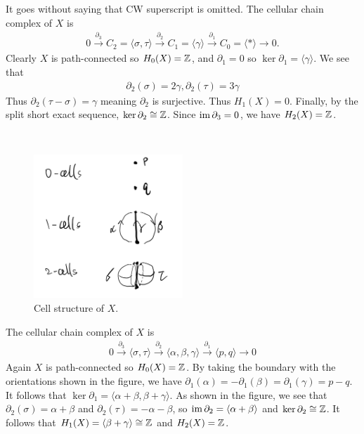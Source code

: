 \documentclass[12pt]{article}
\begin{document}
\begin{problem}[9]
It goes without saying that CW superscript is omitted. The cellular chain complex of $ X$ is
\begin{align*}
	0 \xrightarrow{ \partial_3}  C_2 = \langle \sigma, \tau  \rangle  \xrightarrow{ \partial _2}  C_1 = \langle \gamma  \rangle \xrightarrow{ \partial _1}  C_0 = \langle * \rangle \to 0  .
\end{align*}
Clearly $ X$ is path-connected so $ H_0(X) = \mathbb{Z}$, and $ \partial _1 = 0$ so $ \ker \partial _1 = \langle \gamma \rangle$. We see that
\begin{align*}
	\partial _2( \sigma) = 2 \gamma, \partial _2( \tau) = 3 \gamma
\end{align*}
Thus $ \partial _2( \tau - \sigma) = \gamma$ meaning $ \partial _2$ is surjective. Thus $ H_1(X) = 0$. Finally, by the split short exact sequence, $ \ker \partial _2 \cong \mathbb{Z}$. Since $ \operatorname{im} \partial _3 = 0$, we have $ H_2(X) = \mathbb{Z}$.
\end{problem}
\begin{problem}[10]
~\begin{figure}[H]
	\centering
	\includegraphics[width=0.5\textwidth]{./figures/5_10.png}
	\caption{Cell structure of $ X$.}
\end{figure}
The cellular chain complex of $ X$ is
 \begin{align*}
	0 \xrightarrow{ \partial _3} \langle \sigma, \tau \rangle \xrightarrow{ \partial _2} \langle \alpha, \beta, \gamma \rangle  \xrightarrow{ \partial _1} \langle p,q \rangle \to 0
\end{align*}
Again $ X$ is path-connected so  $ H_0(X) = \mathbb{Z}$. By taking the boundary with the orientations shown in the figure, we have $ \partial _1( \alpha) = - \partial _1( \beta) = \partial _1( \gamma) = p-q$. It follows that $ \ker \partial _1 = \langle \alpha+ \beta, \beta+ \gamma \rangle$. As shown in the figure, we see that $ \partial _2( \sigma) = \alpha+ \beta$ and $ \partial _2( \tau) = - \alpha- \beta$, so $ \operatorname{im} \partial _2 = \langle \alpha + \beta \rangle$ and $ \ker \partial _2 \cong\mathbb{Z}$. It follows that $ H_1(X) = \langle \beta+ \gamma \rangle \cong \mathbb{Z}$ and $ H_2(X) = \mathbb{Z}$.
\end{problem}
\end{document}
